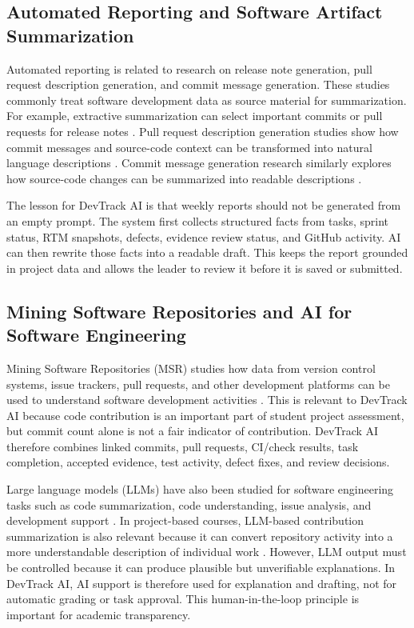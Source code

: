 \documentclass[runningheads]{llncs}
\begin{document}
\subsection{Automated Reporting and Software Artifact Summarization}

Automated reporting is related to research on release note generation, pull request
description generation, and commit message generation. These studies commonly treat
software development data as source material for summarization. For example,
extractive summarization can select important commits or pull requests for release
notes \cite{releaseNotes}. Pull request description generation studies show how
commit messages and source-code context can be transformed into natural language
descriptions \cite{prDescriptions}. Commit message generation research similarly explores
how source-code changes can be summarized into readable descriptions
\cite{commitMessages}.

The lesson for DevTrack AI is that weekly reports should not be generated from an
empty prompt. The system first collects structured facts from tasks, sprint status,
RTM snapshots, defects, evidence review status, and GitHub activity. AI can then
rewrite those facts into a readable draft. This keeps the report grounded in project
data and allows the leader to review it before it is saved or submitted.

\subsection{Mining Software Repositories and AI for Software Engineering}

Mining Software Repositories (MSR) studies how data from version control systems,
issue trackers, pull requests, and other development platforms can be used to
understand software development activities \cite{teachingMsr}. This is relevant to
DevTrack AI because code contribution is an important part of student project
assessment, but commit count alone is not a fair indicator of contribution. DevTrack
AI therefore combines linked commits, pull requests, CI/check results, task
completion, accepted evidence, test activity, defect fixes, and review decisions.

Large language models (LLMs) have also been studied for software engineering tasks
such as code summarization, code understanding, issue analysis, and development
support \cite{llmSurvey}. In project-based
courses, LLM-based contribution summarization is also relevant because it can convert
repository activity into a more understandable description of individual work
\cite{llmContribution}. However, LLM output must be controlled because it can
produce plausible but unverifiable explanations. In DevTrack AI, AI support is
therefore used for explanation and drafting, not for automatic grading or task
approval. This human-in-the-loop principle is important for academic transparency.
\end{document}
